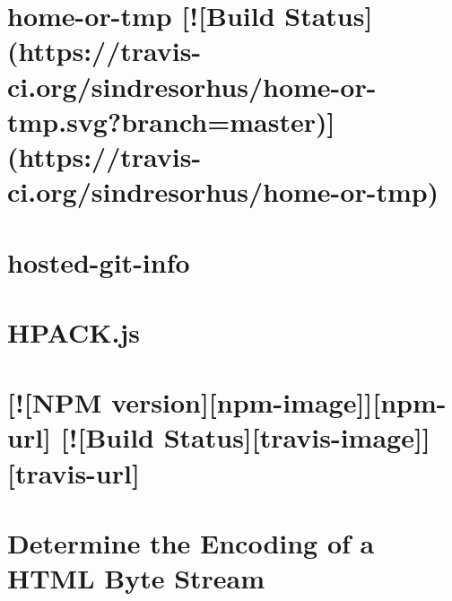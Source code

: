 \documentclass[twoside]{book}
\newcommand{\+}{\discretionary{\mbox{\scriptsize$\hookleftarrow$}}{}{}}
\begin{document}
\chapter{home-\/or-\/tmp \mbox{[}!\mbox{[}Build Status\mbox{]}(https\+://travis-\/ci.org/sindresorhus/home-\/or-\/tmp.svg?branch=master)\mbox{]}(https\+://travis-\/ci.org/sindresorhus/home-\/or-\/tmp)}
\label{md__c_1_workspace_demo_src_main_script_node_modules_home-or-tmp_readme}

\chapter{hosted-\/git-\/info}
\label{md__c_1_workspace_demo_src_main_script_node_modules_hosted-git-info__r_e_a_d_m_e}

\chapter{H\+P\+A\+C\+K.\+js}
\label{md__c_1_workspace_demo_src_main_script_node_modules_hpack_8js__r_e_a_d_m_e}

\chapter{\mbox{[}!\mbox{[}N\+PM version\mbox{]}\mbox{[}npm-\/image\mbox{]}\mbox{]}\mbox{[}npm-\/url\mbox{]} \mbox{[}!\mbox{[}Build Status\mbox{]}\mbox{[}travis-\/image\mbox{]}\mbox{]}\mbox{[}travis-\/url\mbox{]}}
\label{md__c_1_workspace_demo_src_main_script_node_modules_html-comment-regex__r_e_a_d_m_e}

\chapter{Determine the Encoding of a H\+T\+ML Byte Stream}
\label{md__c_1_workspace_demo_src_main_script_node_modules_html-encoding-sniffer__r_e_a_d_m_e}

\end{document}

